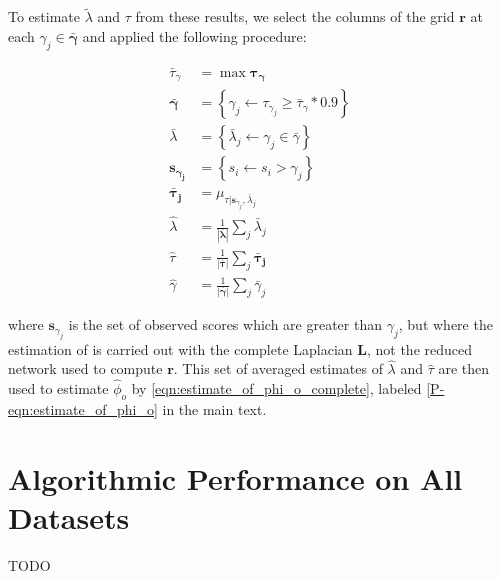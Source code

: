 \documentclass{article}
\begin{document}
        To estimate ${\tilde \lambda}$ and $\tau$ from these results,
    we select the columns of the grid $\mathbf{r}$ at each $\gamma_j
    \in \mathbf{{\bar \gamma}}$ and applied the following procedure:

    \begin{align}
    {\bar \tau_\gamma} &= \max{\mathbf{\tau_\gamma}}\\
    \mathbf{\bar \gamma} &= \left\{\gamma_j \leftarrow\tau_{\gamma_j}
        \ge {\bar \tau_\gamma} * 0.9\right\}\\
    {\bar \lambda} &= \left\{ {\bar \lambda_j} \leftarrow \gamma_j \in {\bar \gamma}\right\}\\
    \mathbf{s_{\gamma_j}} &= \left\{s_i \leftarrow s_i > \gamma_j\right\} \\
    \mathbf{{\bar \tau_j}} &= \mu_{\tau|\mathbf{s}_{\gamma_j}, {\bar \lambda}_j}\\
    {\hat \lambda} &= \frac{1}{|\mathbf{{\bar \lambda}}|}\sum_j {\bar \lambda}_j\\
    {\hat \tau} &= \frac{1}{|\mathbf{{\bar \tau}}|}\sum_j \mathbf{{\bar \tau_j}}\\
    {\hat \gamma} &= \frac{1}{|\mathbf{{\bar \gamma}}|}\sum_j {\bar \gamma}_j
    \end{align}

    \noindent where $\mathbf{s}_{\gamma_j}$ is the set of observed
    scores which are greater than $\gamma_j$, but where the estimation
    of is carried out with the complete Laplacian $\mathbf{L}$,
    not the reduced network used to compute $\mathbf{r}$. This set of
    averaged estimates of ${\hat \lambda}$ and ${\hat \tau}$ are then
    used to estimate ${\hat \phi_o}$ by \ref{eqn:estimate_of_phi_o_complete}, labeled
    \ref{P-eqn:estimate_of_phi_o} in the main text.

\section{Algorithmic Performance on All Datasets}\label{sec:algorithm_performance}
TODO
\end{document}

